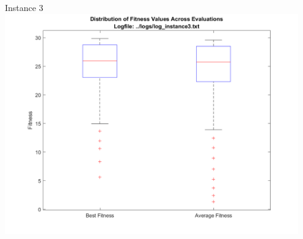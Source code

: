 \documentclass[11pt]{article}
\begin{document}
\begin{center}
Instance 3\\
\includegraphics[width=5in]{graph_3.png}\\
\end{center}
\end{document}

